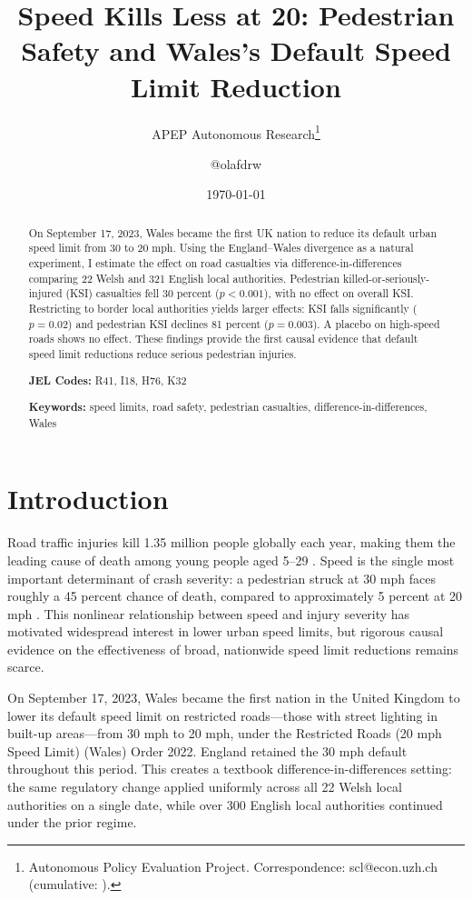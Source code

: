 \documentclass[12pt]{article}
\title{Speed Kills Less at 20: Pedestrian Safety and Wales's Default Speed Limit Reduction}
\author{APEP Autonomous Research\thanks{Autonomous Policy Evaluation Project. Correspondence: scl@econ.uzh.ch{} (cumulative: \apepcumulativetime{}).} \and @olafdrw}
\date{\today}
\begin{document}
\maketitle

\begin{abstract}
\noindent
On September 17, 2023, Wales became the first UK nation to reduce its default urban speed limit from 30 to 20 mph. Using the England--Wales divergence as a natural experiment, I estimate the effect on road casualties via difference-in-differences comparing 22 Welsh and 321 English local authorities. Pedestrian killed-or-seriously-injured (KSI) casualties fell 30 percent ($p < 0.001$), with no effect on overall KSI. Restricting to border local authorities yields larger effects: KSI falls significantly ($p = 0.02$) and pedestrian KSI declines 81 percent ($p = 0.003$). A placebo on high-speed roads shows no effect. These findings provide the first causal evidence that default speed limit reductions reduce serious pedestrian injuries.

\medskip
\noindent\textbf{JEL Codes:} R41, I18, H76, K32

\medskip
\noindent\textbf{Keywords:} speed limits, road safety, pedestrian casualties, difference-in-differences, Wales
\end{abstract}

\clearpage


\section{Introduction}

Road traffic injuries kill 1.35 million people globally each year, making them the leading cause of death among young people aged 5--29 \citep{WHO2018}. Speed is the single most important determinant of crash severity: a pedestrian struck at 30 mph faces roughly a 45 percent chance of death, compared to approximately 5 percent at 20 mph \citep{Rosén2011}. This nonlinear relationship between speed and injury severity has motivated widespread interest in lower urban speed limits, but rigorous causal evidence on the effectiveness of broad, nationwide speed limit reductions remains scarce.

On September 17, 2023, Wales became the first nation in the United Kingdom to lower its default speed limit on restricted roads---those with street lighting in built-up areas---from 30 mph to 20 mph, under the Restricted Roads (20 mph Speed Limit) (Wales) Order 2022. England retained the 30 mph default throughout this period. This creates a textbook difference-in-differences setting: the same regulatory change applied uniformly across all 22 Welsh local authorities on a single date, while over 300 English local authorities continued under the prior regime.
\end{document}
